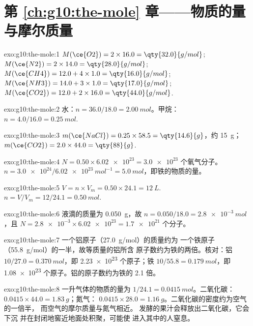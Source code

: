 \section*{第 \ref{ch:g10:the-mole} 章——物质的量与摩尔质量}

\begin{solution}{exo:g10:the-mole:1}
$M(\ce{O2}) = 2 \times 16.0 = \qty{32.0}{g/mol}$;
$M(\ce{N2}) = 2 \times 14.0 = \qty{28.0}{g/mol}$;
$M(\ce{CH4}) = 12.0 + 4 \times 1.0 = \qty{16.0}{g/mol}$;
$M(\ce{NH3}) = 14.0 + 3 \times 1.0 = \qty{17.0}{g/mol}$;
$M(\ce{CO2}) = 12.0 + 2 \times 16.0 = \qty{44.0}{g/mol}$.
\end{solution}

\begin{solution}{exo:g10:the-mole:2}
水：$n = 36.0 / 18.0 = \qty{2.00}{mol}$。甲烷：
$n = 4.0 / 16.0 = \qty{0.25}{mol}$.
\end{solution}

\begin{solution}{exo:g10:the-mole:3}
$m(\ce{NaCl}) = 0.25 \times 58.5 = \qty{14.6}{g}$，约 \qty{15}{g}；
$m(\ce{CO2}) = 2.0 \times 44.0 = \qty{88}{g}$.
\end{solution}

\begin{solution}{exo:g10:the-mole:4}
$N = 0.50 \times \num{6.02e23} = \num{3.0e23}$ 个氧气分子。
$n = \num{3.0e24} / \qty{6.02e23}{mol^{-1}} = \qty{5.0}{mol}$，即铁的物质的量。
\end{solution}

\begin{solution}{exo:g10:the-mole:5}
$V = n \times V_m = 0.50 \times 24.1 = \qty{12}{L}$.
$n = V / V_m = 12 / 24.1 = \qty{0.50}{mol}$.
\end{solution}

\begin{solution}{exo:g10:the-mole:6}
液滴的质量为 \qty{0.050}{g}，故
$n = 0.050 / 18.0 = \qty{2.8e-3}{mol}$，且
$N = \num{2.8e-3} \times \num{6.02e23} = \num{1.7e21}$ 个分子。
\end{solution}

\begin{solution}{exo:g10:the-mole:7}
一个铝原子（\qty{27.0}{g/mol}）的质量约为
一个铁原子（\qty{55.8}{g/mol}）的一半，故等质量的铝所含
原子数约为铁的两倍。核对：铝 $10/27.0 = \qty{0.370}{mol}$，即
\num{2.23e23} 个原子；铁 $10/55.8 = \qty{0.179}{mol}$，即
\num{1.08e23} 个原子。铝的原子数约为铁的 2.1 倍。
\end{solution}

\begin{solution}{exo:g10:the-mole:8}
一升气体的物质的量为 $1/24.1 = \qty{0.0415}{mol}$。二氧化碳：
$0.0415 \times 44.0 = \qty{1.83}{g}$；氮气：
$0.0415 \times 28.0 = \qty{1.16}{g}$。二氧化碳的密度约为空气的一倍半，
而空气的摩尔质量与氮气相近。
发酵的果汁会释放出二氧化碳，它会下沉
并在封闭地窖近地面处积聚，可能使
进入其中的人窒息。
\end{solution}

